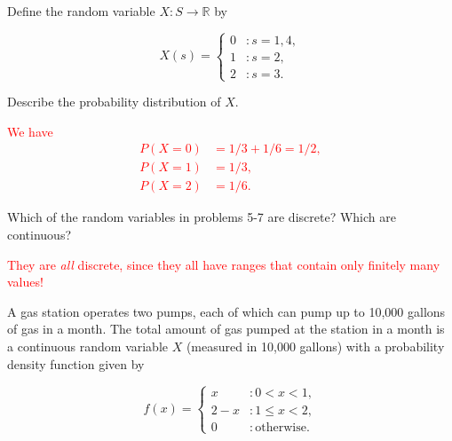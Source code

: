\documentclass[12pt,reqno]{amsart}
\begin{document}
Define the random variable $X:S\to \mathbb{R}$ by

	\[
	X(s) = \begin{cases}
	0 & : s = 1, 4, \\
	1 & : s=2, \\
	2 & : s=3.
	\end{cases}
	\]

Describe the probability distribution of $X$.

\bigskip
\textcolor{red}{We have
	\begin{align*}
	P(X=0) &= 1/3 + 1/6 = 1/2, \\
	P(X=1) &= 1/3, \\
	P(X=2) &= 1/6.
	\end{align*}}










\bigskip
\prob Which of the random variables in problems 5-7 are discrete? Which are continuous?

\bigskip
\textcolor{red}{They are \textit{all} discrete, since they all have ranges that contain only finitely many values!}













\bigskip
\prob A gas station operates two pumps, each of which can pump up to 10,000 gallons of gas in a month. The total amount of gas pumped at the station in a month is a continuous random variable $X$ (measured in 10,000 gallons) with a probability density function given by

	\[
	f(x) = \begin{cases}
	x & : 0 < x < 1, \\
	2-x & : 1 \leq x < 2, \\
	0 & : \text{otherwise}.
	\end{cases}
	\]
\end{document}
